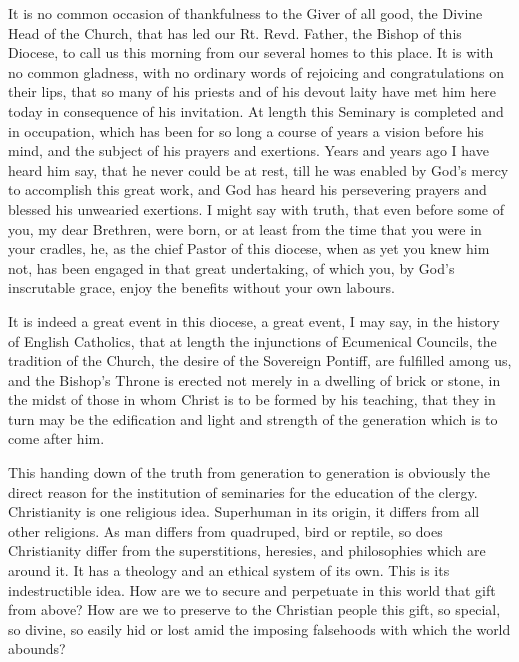 

It is no common occasion of thankfulness to
the Giver of all good, the Divine Head of the Church, that has led our
Rt. Revd. Father, the Bishop of this Diocese, to call us this morning
from our several homes to this place. It is with no common gladness,
with no ordinary words of rejoicing and congratulations on their lips,
that so many of his priests and of his devout laity have met him here
today in consequence of his invitation. At length this Seminary is
completed and in occupation, which has been for so long a course of
years a vision before his mind, and the subject of his prayers and
exertions. Years and years ago I have heard him say, that he never
could be at rest, till he was enabled by God's mercy to accomplish
this great work, and God has heard his persevering prayers and blessed
his unwearied exertions. I might say with truth, that even before some
of you, my dear Brethren, were born, or at least from the time that
you were in your cradles, he, as the chief Pastor of this diocese,
when as yet you knew him not, has been engaged in that great
undertaking, of which you, by God's inscrutable grace, enjoy the
benefits without your own labours.

It is indeed a great event in this diocese, a
great event, I may say, in the history of English Catholics, that at
length the injunctions of Ecumenical Councils, the tradition of the
Church, the desire of the Sovereign Pontiff, are fulfilled among us,
and the Bishop's Throne is erected not merely in a dwelling of brick
or stone, in the midst of those in whom Christ is to be formed by his
teaching, that they in turn may be the edification and light and
strength of the generation which is to come after him.

This handing down of the truth from generation to
generation is obviously the direct reason for the institution of
seminaries for the education of the clergy. Christianity is one
religious idea. Superhuman in its origin, it differs from all other
religions. As man differs from quadruped, bird or reptile, so does
Christianity differ from the superstitions, heresies, and philosophies
which are around it. It has a theology and an ethical system of its
own. This is its indestructible idea. How are we to secure and
perpetuate in this world that gift from above? How are we to preserve
to the Christian people this gift, so special, so divine, so easily
hid or lost amid the imposing falsehoods with which the world abounds?

